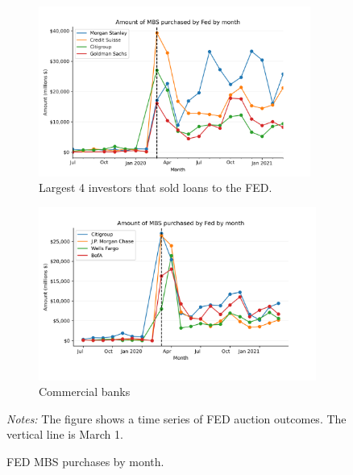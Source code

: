 \documentclass[11pt,a4paper]{article}
\begin{document}
\pagebreak
\begin{figure}[h]
    \centering
    \begin{subfigure}[b]{0.65\textwidth}
        \includegraphics[width=0.98\textwidth]{../results/figures/fed_mbs_amount_by_month_example_larg4.png}
        \caption{Largest 4 investors that sold loans to the FED.}\label{fig:larg4}
       \end{subfigure}
       \begin{subfigure}[b]{0.65\textwidth}
        \includegraphics[width=0.999\textwidth]{../results/figures/fed_mbs_amount_by_month_example_retail.png}
        \caption{ Commercial banks } 
       \end{subfigure}
       \caption{FED MBS purchases by month.}\label{fig:fed_mbs_amount_by_month}
     \begin{minipage}{\textwidth}
        \footnotesize{\textit{Notes:} The figure shows a time series of FED auction outcomes. The vertical line is March 1.  } 
        \end{minipage}
  \end{figure}
\end{document}
